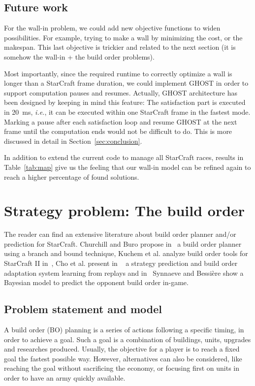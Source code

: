 \documentclass[journal]{IEEEtran}
\newcommand{\ghost}{\textsc{GHOST}\xspace}
\newcommand{\ie}{\textit{i.e.}}
\begin{document}
\subsection{Future work}

For the wall-in problem, we could add new objective functions to widen
possibilities. For  example, trying to  make a wall by  minimizing the
cost, or the makespan.  This last objective is trickier and related to
the  next  section (it  is  somehow  the  wall-in  + the  build  order
problems).

Most importantly, since  the required runtime to  correctly optimize a
wall is  longer than  a StarCraft frame  duration, we  could implement
\ghost in order  to support computation pauses  and resumes. Actually,
\ghost architecture has been designed by keeping in mind this feature:
The satisfaction  part is executed  in 20~ms,  \ie, it can  be executed
within one StarCraft frame in the fastest mode.  Marking a pause after
each satisfaction loop  and resume \ghost at the next  frame until the
computation ends would not be difficult  to do. This is more discussed
in detail in Section~\ref{sec:conclusion}.

In addition to extend the current  code to manage all StarCraft races,
results in  Table~\ref{tab:map} give us  the feeling that  our wall-in
model  can be  refined again  to reach  a higher  percentage of  found
solutions.


\section{Strategy problem: The build order}\label{sec:bo}

The reader can find an  extensive literature about build order planner
and/or   prediction  for   StarCraft.  Churchill   and  Buro   propose
in~\cite{ChurchillB11} a build order planner  using a branch and bound
technique, Kuchem  et al. analyze  build order tools for  StarCraft II
in~\cite{KuchemPR13},  Cho  et  al.    present  in  ~\cite{ChoKC13}  a
strategy prediction  and build  order adaptation system  learning from
replays and  in~\cite{SynnaeveB11-a} Synnaeve and Bessi{\`e}re  show a
Bayesian model to predict the opponent build order in-game.

\subsection{Problem statement and model}
A build order (BO) planning is a series of actions following a specific
timing, in order to  achieve a goal.  Such a goal  is a combination of
buildings,  units, upgrades  and  researches  produced.  Usually,  the
objective for a  player is to reach a fixed  goal the fastest possible
way. However, alternatives  can also be considered,  like reaching the
goal without sacrificing  the economy, or focusing first  on units in
order to have an army quickly available.
\end{document}
